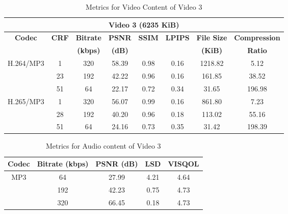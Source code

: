     \begin{table}[H]
        \centering
        \caption{Metrics for Video Content of Video 3}
        \label{table:vid-met-3}
        \begin{tabular}{|c|c|c|c|c|c|c|c|}
        \hline
        \multicolumn{8}{|c|}{\textbf{Video 3 (6235 KiB)}} \\ \hline
        \multirow{2}{*}{\textbf{Codec}} & \multirow{2}{*}{\textbf{CRF}} & \textbf{Bitrate} & \textbf{PSNR} & \textbf{SSIM} & \textbf{LPIPS} & \textbf{File Size} & \textbf{Compression} \\ 
        &  & \textbf{(kbps)} & \textbf{(dB)} &  &  & \textbf{(KiB)} & \textbf{Ratio} \\ \hline
        \multirow{3}{*}{H.264/MP3} & 1  & 320 & 58.39 & 0.98 & 0.16 & 1218.82 & 5.12 \\ \cline{2-8} 
                                   & 23 & 192 & 42.22 & 0.96 & 0.16 & 161.85  & 38.52 \\ \cline{2-8} 
                                   & 51 & 64  & 22.17 & 0.72 & 0.34 & 31.65   & 196.98 \\ \hline
        \multirow{3}{*}{H.265/MP3} & 1  & 320 & 56.07 & 0.99 & 0.16 & 861.80  & 7.23 \\ \cline{2-8} 
                                   & 28 & 192 & 40.20 & 0.96 & 0.18 & 113.02  & 55.16 \\ \cline{2-8} 
                                   & 51 & 64  & 24.16 & 0.73 & 0.35 & 31.42   & 198.39 \\ \hline
        \end{tabular}
    \end{table}
    


    \begin{table}[H]
        \centering
        \caption{Metrics for Audio content of Video 3}
        \label{table:aud-met-3}
        \begin{tabular}{|c|c|c|c|c|}
        \hline
        \textbf{Codec} & \textbf{Bitrate (kbps)} & \textbf{PSNR (dB)} & \textbf{LSD} & \textbf{VISQOL} \\ \hline
        \multirow{3}{*}{MP3} & 64  & 27.99 & 4.21 & 4.64 \\ \cline{2-5} 
                                   & 192 & 42.23 & 0.75 & 4.73 \\ \cline{2-5} 
                                   & 320 & 66.45 & 0.18 & 4.73 \\ \hline
        \end{tabular}
    \end{table}
    



